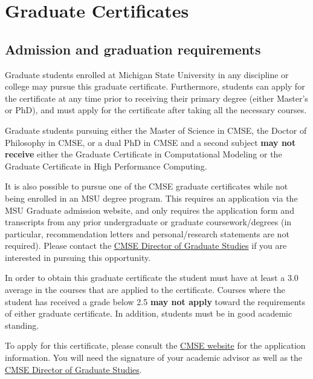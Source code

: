 \section{Graduate Certificates}
\label{sec:grad_certs}

\subsection{Admission and graduation requirements}
\label{sec:cert_requirements}

Graduate students enrolled at Michigan State University in any
discipline or college may pursue this graduate certificate.
Furthermore, students can apply for the certificate at any time prior
to receiving their primary degree (either Master’s or PhD), and must
apply for the certificate after taking all the necessary courses.

Graduate students pursuing either the Master of Science in CMSE, the
Doctor of Philosophy in CMSE, or a dual PhD in CMSE and a second
subject \textbf{may not  receive} either the Graduate Certificate in
Computational Modeling or the Graduate Certificate in High Performance
Computing.

It is also possible to pursue one of the CMSE graduate certificates
while not being enrolled in an MSU degree program.  This requires an
application via the MSU Graduate admission website, and only requires the
application form and transcripts from any prior undergraduate or
graduate coursework/degrees (in particular, recommendation letters and
personal/research statements are not required).  Please contact the
\href{mailto:cmsegrad@msu.edu}{CMSE Director of Graduate Studies} if
you are interested in pursuing this opportunity.

In order to obtain this graduate certificate the student must have at
least a 3.0 average in the courses that are applied to the
certificate.  Courses where the student has received a grade below 2.5
\textbf{may not apply} toward the requirements of either graduate
certificate.  In addition, students must be in good academic standing.

To apply for this certificate, please consult the
\href{https://cmse.msu.edu/academics/graduate-program/}{CMSE website}
for the application information.  You will need the signature of your
academic advisor as well as the \href{mailto:cmsegrad@msu.edu}{CMSE
Director of Graduate Studies}.





